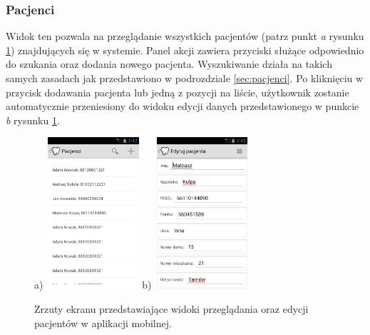 \documentclass[11pt]{aghdpl}
\begin{document}
\subsubsection{Pacjenci}
\label{sec:pacjenciMobile}

Widok ten pozwala na przeglądanie wszystkich pacjentów (patrz punkt \emph{a} rysunku \ref{fig:pacjenciMobile}) znajdujących się w systemie. Panel akcji zawiera przyciski służące odpowiednio do szukania oraz dodania nowego pacjenta. Wyszukiwanie działa na takich samych zasadach jak przedstawiono w podrozdziale \ref{sec:pacjenci}. Po kliknięciu w przycisk dodawania pacjenta lub jedną z pozycji na liście, użytkownik zostanie automatycznie przeniesiony do widoku edycji danych przedstawionego w punkcie \emph{b} rysunku \ref{fig:pacjenciMobile}.

\begin{figure}[h!]
	\begin{center}
		a)~\includegraphics[width=0.3\textwidth]{pacjenciMobile}
		\hspace{5mm}
		b)~\includegraphics[width=0.3\textwidth]{pacjentMobile}
	\end{center}
	\caption{Zrzuty ekranu przedstawiające widoki przeglądania oraz edycji pacjentów w aplikacji mobilnej.}
	\label{fig:pacjenciMobile}
\end{figure}
\end{document}
